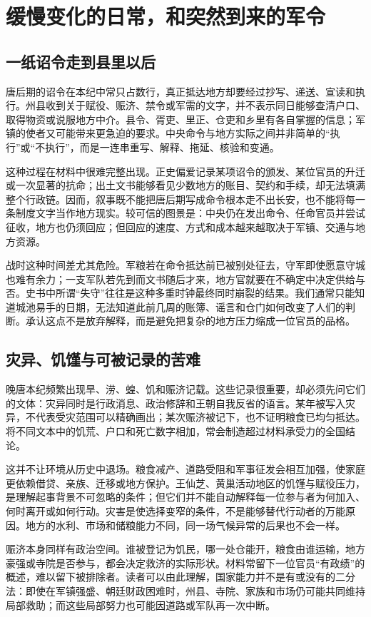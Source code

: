 \section{缓慢变化的日常，和突然到来的军令}

\subsection{一纸诏令走到县里以后}
唐后期的诏令在本纪中常只占数行，真正抵达地方却要经过抄写、递送、宣读和执行。州县收到关于赋役、赈济、禁令或军需的文字，并不表示同日能够查清户口、取得物资或说服地方中介。县令、胥吏、里正、仓吏和乡里有各自掌握的信息；军镇的使者又可能带来更急迫的要求。中央命令与地方实际之间并非简单的“执行”或“不执行”，而是一连串重写、解释、拖延、核验和变通。

这种过程在材料中很难完整出现。正史偏爱记录某项诏令的颁发、某位官员的升迁或一次显著的抗命；出土文书能够看见少数地方的账目、契约和手续，却无法填满整个行政链。因而，叙事既不能把唐后期写成命令根本走不出长安，也不能将每一条制度文字当作地方现实。较可信的图景是：中央仍在发出命令、任命官员并尝试征收，地方也仍须回应；但回应的速度、方式和成本越来越取决于军镇、交通与地方资源。

战时这种时间差尤其危险。军粮若在命令抵达前已被别处征去，守军即使愿意守城也难有余力；一支军队若先到而文书随后才来，地方官就要在不确定中决定供给与否。史书中所谓“失守”往往是这种多重时钟最终同时崩裂的结果。我们通常只能知道城池易手的日期，无法知道此前几周的账簿、谣言和仓门如何改变了人们的判断。承认这点不是放弃解释，而是避免把复杂的地方压力缩成一位官员的品格。

\subsection{灾异、饥馑与可被记录的苦难}
晚唐本纪频繁出现旱、涝、蝗、饥和赈济记载。这些记录很重要，却必须先问它们的文体：灾异同时是行政消息、政治修辞和王朝自我反省的语言。某年被写入灾异，不代表受灾范围可以精确画出；某次赈济被记下，也不证明粮食已均匀抵达。将不同文本中的饥荒、户口和死亡数字相加，常会制造超过材料承受力的全国结论。

这并不让环境从历史中退场。粮食减产、道路受阻和军事征发会相互加强，使家庭更依赖借贷、亲族、迁移或地方保护。王仙芝、黄巢活动地区的饥馑与赋役压力，是理解起事背景不可忽略的条件；但它们并不能自动解释每一位参与者为何加入、何时离开或如何行动。灾害是使选择变窄的条件，不是能够替代行动者的万能原因。地方的水利、市场和储粮能力不同，同一场气候异常的后果也不会一样。

赈济本身同样有政治空间。谁被登记为饥民，哪一处仓能开，粮食由谁运输，地方豪强或寺院是否参与，都会决定救济的实际形状。材料常留下一位官员“有政绩”的概述，难以留下被排除者。读者可以由此理解，国家能力并不是有或没有的二分法：即使在军镇强盛、朝廷财政困难时，州县、寺院、家族和市场仍可能共同维持局部救助；而这些局部努力也可能因道路或军队再一次中断。

